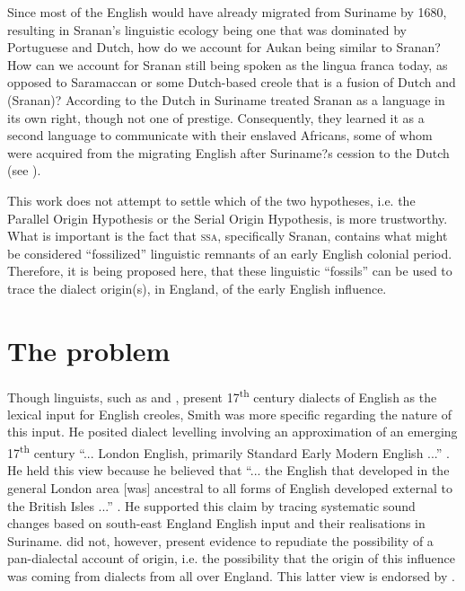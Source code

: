 Since most of the English would have already migrated from Suriname by 1680, resulting in Sranan's linguistic ecology being one that was dominated by Portuguese and Dutch, how do we account for Aukan being similar to Sranan? How can we account for Sranan still being spoken as the lingua franca today, as opposed to Saramaccan or some Dutch-based creole that is a fusion of Dutch and  (Sranan)? According to \citet{Holm94} the Dutch in Suriname treated Sranan as a language in its own right, though not one of prestige. Consequently, they learned it as a second language to communicate with their enslaved Africans, some of whom were acquired from the migrating English after Suriname?s cession to the Dutch (see ).

This work does not attempt to settle which of the two hypotheses, i.e. the Parallel Origin Hypothesis or the Serial Origin Hypothesis, is more trustworthy. What is important is the fact that \textsc{ssa}, specifically Sranan, contains what might be considered ``fossilized'' linguistic remnants of an early English colonial period. Therefore, it is being proposed here, that these linguistic ``fossils'' can be used to trace the dialect origin(s), in England, of the early English influence.

\section{The problem} \label{1.3}

Though linguists, such as \citet{Smith08, Smith87} and \citet{Mufwene08, Mufwene01}, present 17\textsuperscript{th} century dialects of English as the lexical input for English creoles, Smith was more specific regarding the nature of this input. He posited dialect levelling involving an approximation of an emerging 17\textsuperscript{th} century ``... London English, primarily Standard Early Modern English ...'' \citep[118]{Smith08}. He held this view because he believed that ``... the English that developed in the general London area [was] ancestral to all forms of English developed external to the British Isles ...'' \citep[118]{Smith08}. He supported this claim by tracing systematic sound changes based on south-east England English input and their realisations in Suriname. \citet{Smith08, Smith87} did not, however, present evidence to repudiate the possibility of a pan-dialectal account of origin, i.e. the possibility that the origin of this influence was coming from dialects from all over England. This latter view is endorsed by \citet{Mufwene08, Mufwene01}.

